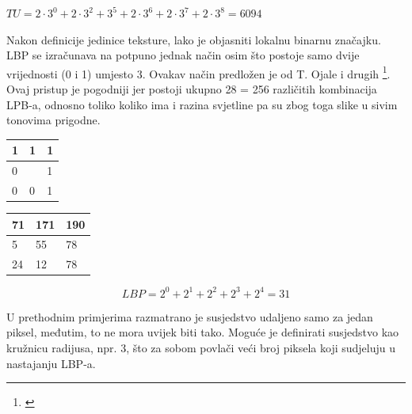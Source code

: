 \documentclass[times, utf8, zavrsni]{fer}
\begin{document}
\begin{center}
\(TU = 2 \cdot 3^0 + 2 \cdot 3^2 + 3^5 + 2 \cdot 3^6 + 2 \cdot 3^7 + 2 \cdot 3^8 = 6094\)
\end{center}

\medskip

Nakon definicije jedinice teksture, lako je objasniti lokalnu binarnu značajku. 
LBP se izračunava na potpuno jednak način osim što postoje samo dvije vrijednosti 
(0 i 1) umjesto 3. Ovakav način predložen je od T. Ojale i drugih \footnote{\cite{ojala}}. Ovaj 
pristup je pogodniji jer postoji ukupno 28  = 256 različitih kombinacija LPB-a, 
odnosno toliko koliko ima i razina svjetline pa su zbog toga slike u sivim 
tonovima prigodne.


\begin{multicols}{2}

\begin{minipage}{\linewidth}
\centering
\begin{tabularx}{0.4\textwidth}{| X | X | X |}
\hline
1 & 1 & 1 \\ 
\hline
0 &  & 1 \\ 
\hline
0 & 0 & 1 \\
\hline
\end{tabularx}
\end{minipage}

\begin{minipage}{\linewidth}
\centering
\begin{tabularx}{0.4\textwidth}{| X | X | X |}
\hline
71 & 171 & 190 \\ 
\hline
5 & 55 & 78 \\ 
\hline
24 & 12 & 78 \\
\hline
\end{tabularx}
\end{minipage}

\end{multicols}

\[LBP = 2^0 + 2^1 + 2^2 + 2^3 + 2^4 = 31\]

\newpage

U prethodnim primjerima razmatrano je susjedstvo udaljeno samo za 
jedan piksel, međutim, to ne mora uvijek biti tako. Moguće je 
definirati susjedstvo kao kružnicu radijusa, npr. 3, što za sobom 
povlači veći broj piksela koji sudjeluju u nastajanju LBP-a. 

\bigbreak
\end{document}
